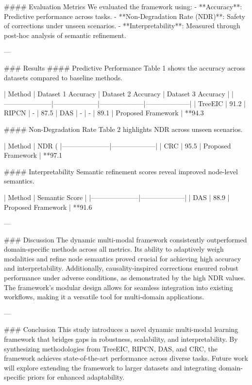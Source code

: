 #### Evaluation Metrics  
We evaluated the framework using:  
- **Accuracy**: Predictive performance across tasks.  
- **Non-Degradation Rate (NDR)**: Safety of corrections under unseen scenarios.  
- **Interpretability**: Measured through post-hoc analysis of semantic refinement.

---

### Results  
#### Predictive Performance  
Table 1 shows the accuracy across datasets compared to baseline methods.  

| Method              | Dataset 1 Accuracy | Dataset 2 Accuracy | Dataset 3 Accuracy |
|---------------------|--------------------|--------------------|--------------------|
| TreeEIC             | 91.2%
| RIPCN               | -                  | 87.5%
| DAS                 | -                  | -                  | 89.1%
| Proposed Framework  | **94.3%

#### Non-Degradation Rate  
Table 2 highlights NDR across unseen scenarios.  

| Method              | NDR (%
|---------------------|--------------------|
| CRC                 | 95.5%
| Proposed Framework  | **97.1%

#### Interpretability  
Semantic refinement scores reveal improved node-level semantics.  

| Method              | Semantic Score    |
|---------------------|--------------------|
| DAS                 | 88.9%
| Proposed Framework  | **91.6%

---

### Discussion  
The dynamic multi-modal framework consistently outperformed domain-specific methods across all metrics. Its ability to adaptively weigh modalities and refine node semantics proved crucial for achieving high accuracy and interpretability. Additionally, causality-inspired corrections ensured robust performance under adverse conditions, as demonstrated by the high NDR values. The framework’s modular design allows for seamless integration into existing workflows, making it a versatile tool for multi-domain applications.

---

### Conclusion  
This study introduces a novel dynamic multi-modal learning framework that bridges gaps in robustness, scalability, and interpretability. By synthesizing methodologies from TreeEIC, RIPCN, DAS, and CRC, the framework achieves state-of-the-art performance across diverse tasks. Future work will explore extending the framework to larger datasets and integrating domain-specific priors for enhanced adaptability.

